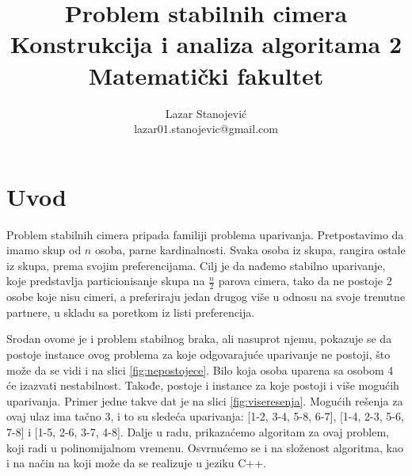 \documentclass[a4paper]{article}
\begin{document}
\title{Problem stabilnih cimera\\ \small{Konstrukcija i analiza algoritama 2\\ Matematički fakultet}}

\author{Lazar Stanojević\\ lazar01.stanojevic@gmail.com}


\maketitle


\tableofcontents

\newpage

\section{Uvod}
\label{sec:uvod}
Problem stabilnih cimera pripada familiji problema uparivanja. Pretpostavimo da imamo skup od $n$ osoba, parne kardinalnosti. Svaka osoba iz skupa, rangira ostale iz skupa, prema svojim preferencijama. Cilj je da nađemo stabilno uparivanje, koje predstavlja particionisanje skupa na $\frac{n}{2}$ parova cimera, tako da ne postoje 2 osobe koje nisu cimeri, a preferiraju jedan drugog više u odnosu na svoje trenutne partnere, u skladu sa poretkom iz listi preferencija.
\newline

Srodan ovome je i problem stabilnog braka, ali nasuprot njemu, pokazuje se da postoje instance ovog problema za koje odgovarajuće uparivanje ne postoji, što može da se vidi i na slici \ref{fig:nepostojece}. Bilo koja osoba uparena sa osobom 4 će izazvati nestabilnost. 
Takođe, postoje i instance za koje postoji i više mogućih uparivanja. Primer jedne takve dat je na slici \ref{fig:viseresenja}.
Mogućih rešenja za ovaj ulaz ima tačno 3, i to su sledeća uparivanja: [1-2, 3-4, 5-8, 6-7], [1-4, 2-3, 5-6, 7-8] i [1-5, 2-6, 3-7, 4-8].
\newline
Dalje u radu, prikazaćemo algoritam za ovaj problem, koji radi u polinomijalnom vremenu. Osvrnućemo se i na složenost algoritma, kao i na način na koji može da se realizuje u jeziku C++.
\end{document}
